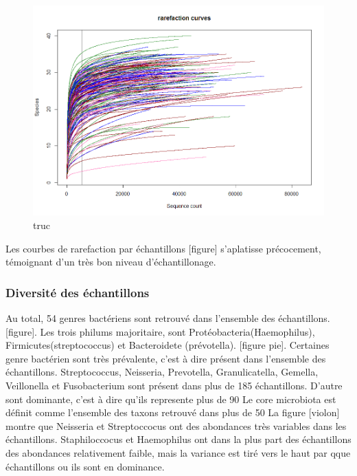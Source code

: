 \documentclass[12pt,a4paper]{article}
\begin{document}
\begin{figure}[!ht]
\begin{center}
\includegraphics[scale=0.5]{img/rarefaction.png}\hfill
\end{center}
\caption{truc}
\label{bach}
\end{figure}




Les courbes de rarefaction par échantillons [figure] s’aplatisse précocement, témoignant d’un très bon niveau d’échantillonage.

\subsubsection{Diversité des échantillons}

Au total, 54 genres bactériens sont retrouvé dans l’ensemble des échantillons. [figure].
Les trois philums majoritaire, sont Protéobacteria(Haemophilus), Firmicutes(streptococcus) et Bacteroidete (prévotella). [figure pie].
Certaines genre bactérien sont très prévalente, c’est à dire présent dans l’ensemble des échantillons. Streptococcus, Neisseria, Prevotella, Granulicatella, Gemella, Veillonella et Fusobacterium sont présent dans plus de 185 échantillons.
D’autre sont dominante, c’est à dire qu’ils represente plus de 90%
Le core microbiota est définit comme l’ensemble des taxons retrouvé dans plus de 50%
La figure [violon] montre que Neisseria et Streptoccocus ont des abondances très variables dans les échantillons. Staphiloccocus et Haemophilus ont dans la plus part des échantillons des abondances relativement faible, mais la variance est tiré vers le haut par qque échantillons ou ils sont en dominance.
\end{document}
